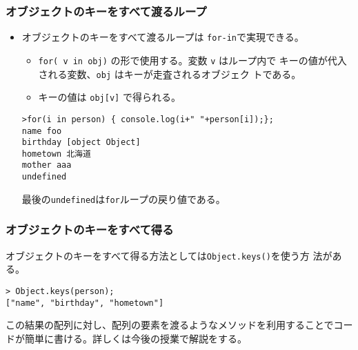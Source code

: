 \begin{frame}[containsverbatim]
\frametitle{オブジェクトのキーをすべて渡るループ}
\begin{itemize}
 \item オブジェクトのキーをすべて渡るループは \Verb+for-in+で実現できる。
\begin{itemize}
 \item \Verb+for( v in obj)+ の形で使用する。変数 \Verb+v+ はループ内で
       キーの値が代入される変数、\Verb+obj+ はキーが走査されるオブジェク
       トである。
 \item キーの値は \Verb+obj[v]+ で得られる。
\end{itemize}
\begin{Verbatim}
>for(i in person) { console.log(i+" "+person[i]);};
name foo
birthday [object Object]
hometown 北海道
mother aaa
undefined
\end{Verbatim}
最後の\Verb+undefined+は\Verb+for+ループの戻り値である。
\end{itemize}
\end{frame}
\begin{frame}[containsverbatim]
 \frametitle{オブジェクトのキーをすべて得る}
 オブジェクトのキーをすべて得る方法としては\Verb+Object.keys()+を使う方
 法がある。
 \begin{Verbatim}
> Object.keys(person);
["name", "birthday", "hometown"]
 \end{Verbatim}
 この結果の配列に対し、配列の要素を渡るようなメソッドを利用することでコー
 ドが簡単に書ける。詳しくは今後の授業で解説をする。
\end{frame}
